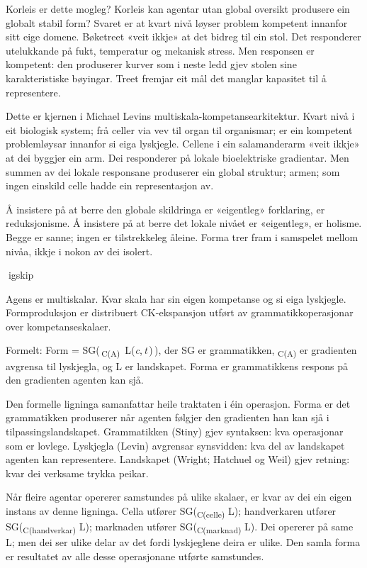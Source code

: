 Korleis er dette mogleg? Korleis kan agentar utan global oversikt produsere ein globalt stabil form? Svaret er at kvart nivå løyser problem kompetent innanfor sitt eige domene. Bøketreet «veit ikkje» at det bidreg til ein stol. Det responderer utelukkande på fukt, temperatur og mekanisk stress. Men responsen er kompetent: den produserer kurver som i neste ledd gjev stolen sine karakteristiske bøyingar. Treet fremjar eit mål det manglar kapasitet til å representere.

Dette er kjernen i Michael Levins multiskala-kompetansearkitektur. Kvart nivå i eit biologisk system; frå celler via vev til organ til organismar; er ein kompetent problemløysar innanfor si eiga lyskjegle. Cellene i ein salamanderarm «veit ikkje» at dei byggjer ein arm. Dei responderer på lokale bioelektriske gradientar. Men summen av dei lokale responsane produserer ein global struktur; armen; som ingen einskild celle hadde ein representasjon av.

Å insistere på at berre den globale skildringa er «eigentleg» forklaring, er reduksjonisme. Å insistere på at berre det lokale nivået er «eigentleg», er holisme. Begge er sanne; ingen er tilstrekkeleg åleine. Forma trer fram i samspelet mellom nivåa, ikkje i nokon av dei isolert.

igskip

Agens er multiskalar. Kvar skala har sin eigen kompetanse og si eiga lyskjegle. Formproduksjon er distribuert CK-ekspansjon utført av grammatikkoperasjonar over kompetanseskalaer.

Formelt: Form = SG(\,\textsubscript{C(A)}\, L(\textit{c},\,\textit{t}\,)\,), der SG er grammatikken, \textsubscript{C(A)} er gradienten avgrensa til lyskjegla, og L er landskapet. Forma er grammatikkens respons på den gradienten agenten kan sjå.

Den formelle ligninga samanfattar heile traktaten i éin operasjon. Forma er det grammatikken produserer når agenten følgjer den gradienten han kan sjå i tilpassingslandskapet. Grammatikken (Stiny) gjev syntaksen: kva operasjonar som er lovlege. Lyskjegla (Levin) avgrensar synsvidden: kva del av landskapet agenten kan representere. Landskapet (Wright; Hatchuel og Weil) gjev retning: kvar dei verksame trykka peikar.

Når fleire agentar opererer samstundes på ulike skalaer, er kvar av dei ein eigen instans av denne ligninga. Cella utfører SG(\textsubscript{C(celle)} L); handverkaren utfører SG(\textsubscript{C(handverkar)} L); marknaden utfører SG(\textsubscript{C(marknad)} L). Dei opererer på same L; men dei ser ulike delar av det fordi lyskjeglene deira er ulike. Den samla forma er resultatet av alle desse operasjonane utførte samstundes.

